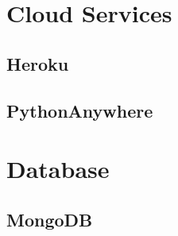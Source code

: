 \section{Cloud Services}
\subsection{Heroku}
\subsection{PythonAnywhere}

\section{Database}
\subsection{MongoDB}